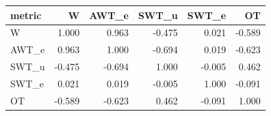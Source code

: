 \begin{tabular}{lrrrrr}
\toprule
metric & W & AWT_e & SWT_u & SWT_e & OT \\
\midrule
W & 1.000 & 0.963 & -0.475 & 0.021 & -0.589 \\
AWT_e & 0.963 & 1.000 & -0.694 & 0.019 & -0.623 \\
SWT_u & -0.475 & -0.694 & 1.000 & -0.005 & 0.462 \\
SWT_e & 0.021 & 0.019 & -0.005 & 1.000 & -0.091 \\
OT & -0.589 & -0.623 & 0.462 & -0.091 & 1.000 \\
\bottomrule
\end{tabular}
